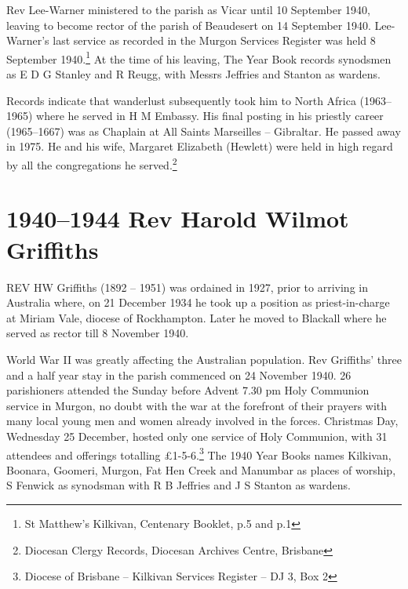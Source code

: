Rev Lee-Warner ministered to the parish as Vicar until 10 September 1940, leaving to become rector of the parish of Beaudesert on 14 September 1940. Lee-Warner's last service as recorded in the Murgon Services Register was held 8 September 1940.\footnote{St Matthew's Kilkivan, Centenary Booklet, p.5 and p.1} At the time of his leaving, The Year Book records synodsmen as E D G Stanley and R Reugg, with Messrs Jeffries and Stanton as wardens.


Records indicate that wanderlust subsequently took him to North Africa (1963--1965) where he served in H M Embassy. His final posting in his priestly career (1965--1667) was as Chaplain at All Saints Marseilles -- Gibraltar. He passed away in 1975. He and his wife, Margaret Elizabeth (Hewlett) were held in high regard by all the congregations he served.\footnote{Diocesan Clergy Records, Diocesan Archives Centre, Brisbane}


\balance


\printendnotes[custom]
\setcounter{endnote}{0}
\chapter{1940--1944 Rev Harold Wilmot Griffiths}
\nobalance


\lettrine[lines=3]{R}{EV}
 HW Griffiths (1892 -- 1951) was ordained in 1927, prior to arriving in Australia where, on 21 December 1934 he took up a position as priest-in-charge at Miriam Vale, diocese of Rockhampton. Later he moved to Blackall where he served as rector till 8 November 1940.

World War II was greatly affecting the Australian population. Rev Griffiths' three and a half year stay in the parish commenced on 24 November 1940. 26 parishioners attended the Sunday before Advent 7.30 pm Holy Communion service in Murgon, no doubt with the war at the forefront of their prayers with many local young men and women already involved in the forces. Christmas Day, Wednesday 25 December, hosted only one service of Holy Communion, with 31 attendees and offerings totalling \pounds1-5-6.\footnote{Diocese of Brisbane -- Kilkivan Services Register -- DJ 3, Box 2} The 1940 Year Books names Kilkivan, Boonara, Goomeri, Murgon, Fat Hen Creek and Manumbar as places of worship, S Fenwick as synodsman with R B Jeffries and J S Stanton as wardens.








